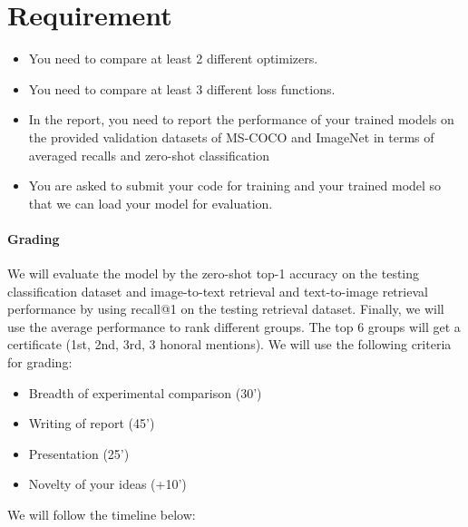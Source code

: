 \documentclass{article}
\begin{document}
\section{Requirement}
\begin{itemize}
\item  You need to compare at least 2 different optimizers. 

\item You need to compare at least 3 different loss functions. 

\item In the report, you need to report the performance of your trained models on the provided validation datasets of MS-COCO and ImageNet in terms of averaged recalls and zero-shot classification  

\item You are asked to submit your code for training and your trained model so that we can load your model for evaluation.

\end{itemize}

\paragraph{Grading} We will evaluate the model by the zero-shot top-1 accuracy on the testing classification dataset and image-to-text retrieval and text-to-image retrieval performance by using recall@1 on the testing retrieval dataset. Finally, we will use the average performance to rank different groups. The top $6$ groups will get a certificate (1st, 2nd, 3rd, 3 honoral mentions). We will use the following criteria for grading:
\begin{itemize}
\item Breadth of experimental comparison (30’) 
\item Writing of report  (45’) 
\item Presentation (25’) 
\item Novelty of your ideas (+10’) 
\end{itemize}
We will follow the timeline below: 
\end{document}
